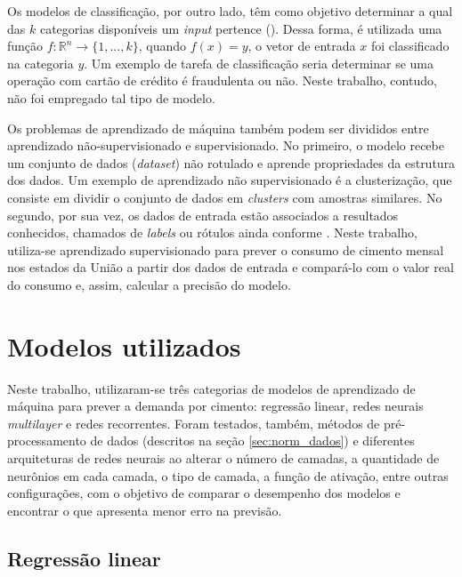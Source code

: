 Os modelos de classificação, por outro lado, têm como objetivo 
determinar a qual das $k$ categorias disponíveis um 
\textit{input} pertence (\cite{dl-oreilly}). Dessa forma, é utilizada uma função  
$ f : \mathbb{R}^n \rightarrow \{1,...,k\}$, quando 
$ f(x) = y$, o vetor de entrada $x$ foi classificado 
na categoria $y$. Um exemplo de tarefa de classificação
seria determinar se uma operação com cartão de crédito 
é fraudulenta ou não. Neste trabalho, contudo, não foi empregado 
tal tipo de modelo. 

Os problemas de 
aprendizado de máquina também podem ser divididos entre
aprendizado não-supervisionado e supervisionado. No primeiro, 
o modelo recebe um conjunto de dados (\textit{dataset}) não 
rotulado e aprende propriedades da estrutura dos dados. 
Um exemplo de aprendizado não supervisionado é a clusterização,
que consiste em dividir o conjunto de dados
em \textit{clusters} com amostras similares. No segundo, por sua vez, 
os dados de entrada estão associados a resultados conhecidos, 
chamados de \textit{labels} ou rótulos ainda conforme \citet{Goodfellow-et-al-2016}. Neste trabalho, utiliza-se aprendizado 
supervisionado para prever o consumo de cimento mensal nos 
estados da União a partir dos dados de entrada e compará-lo 
com o valor real 
do consumo e, assim, calcular a precisão do modelo.

\section{Modelos utilizados}

Neste trabalho, utilizaram-se três categorias de modelos de aprendizado 
de máquina para prever a demanda por cimento: regressão linear, redes
neurais \textit{multilayer} e redes recorrentes. Foram testados, também,
 métodos de pré-processamento de dados (descritos na seção \ref{sec:norm_dados}) e  diferentes arquiteturas de 
redes neurais ao alterar o número de camadas, a quantidade de neurônios
em cada camada, o tipo de camada, a função de ativação, entre outras
configurações, com o objetivo de comparar 
o desempenho dos modelos e encontrar o que apresenta menor erro na previsão.

\subsection{Regressão linear}
\label{sec:reg_lin}

